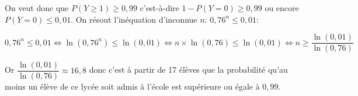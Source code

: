 \documentclass[10pt]{article}
\begin{document}
\begin{enumerate}
\begin{enumerate}
On veut donc que $P(Y\geqslant 1) \geqslant 0,99$ c'est-à-dire $1-P(Y=0) \geqslant 0,99$ ou encore\\ $P(Y=0) \leqslant 0,01$. On résout l'inéquation d'inconnue $n$: $0,76^n \leqslant 0,01$:		
		
$0,76^n \leqslant 0,01 \iff \ln\left (0,76^n\right ) \leqslant \ln\left (0,01\right )
\iff n \times \ln\left (0,76\right ) \leqslant \ln\left (0,01\right )
\iff n \geqslant \dfrac{\ln\left (0,01\right )}{\ln\left (0,76\right )}$

Or $\dfrac{\ln\left (0,01\right )}{\ln\left (0,76\right )}\approx 16,8$ donc c'est à partir de 17 élèves que la probabilité qu'au moins un élève de ce lycée soit admis à l'école est supérieure ou égale à $0,99$.
\end{enumerate}
\end{enumerate}

\bigskip
\end{document}
